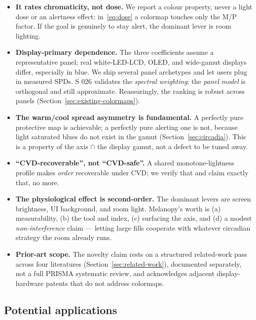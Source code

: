 \documentclass[10pt,a4paper,twocolumn]{article}
\begin{document}
\begin{itemize}
    \item \textbf{It rates chromaticity, not dose.} We report a colour property, never a light dose or an alertness effect: in~\eqref{eq:dose} a colormap touches only the M/P factor.
        If the goal is genuinely to stay alert, the dominant lever is room lighting.
    \item \textbf{Display-primary dependence.} The three coefficients assume a representative panel; real white-LED-LCD, OLED, and wide-gamut displays differ, especially in blue.
        We ship several panel archetypes and let users plug in measured SPDs.
        S 026 validates the \emph{spectral weighting}; the \emph{panel model} is orthogonal and still approximate.
        Reassuringly, the ranking is robust across panels (Section~\ref{sec:existing-colormaps}).
    \item \textbf{The warm/cool spread asymmetry is fundamental.} A perfectly pure protective map is achievable; a perfectly pure alerting one is not, because light saturated blues do not exist in the gamut (Section~\ref{sec:circadia}).
        This is a property of the axis $\cap$ the display gamut, not a defect to be tuned away.
    \item \textbf{``CVD-recoverable'', not ``CVD-safe''.} A shared monotone-lightness profile makes \emph{order} recoverable under CVD; we verify that and claim exactly that, no more.
    \item \textbf{The physiological effect is second-order.} The dominant levers are screen brightness, UI background, and room light.
        Melanopy's worth is (a) measurability, (b) the tool and index, (c) surfacing the axis, and (d) a modest \emph{non-interference} claim --- letting large fills cooperate with whatever circadian strategy the room already runs.
    \item \textbf{Prior-art scope.} The novelty claim rests on a structured related-work pass across four literatures (Section~\ref{sec:related-work}), documented separately, not a full PRISMA systematic review, and acknowledges adjacent display-hardware patents that do not address colormaps.
\end{itemize}

\subsection{Potential applications}\label{sec:applications}
\end{document}
